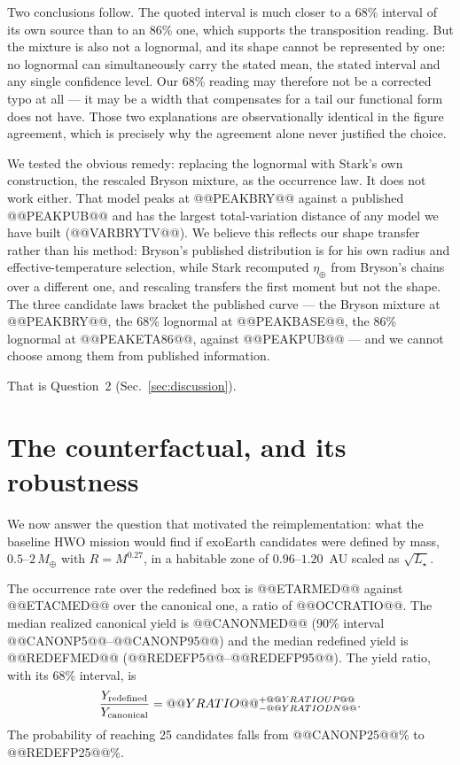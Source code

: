 \documentclass[11pt,a4paper]{article}
\begin{document}
Two conclusions follow. The quoted interval is much closer to a 68\% interval of its own source
than to an 86\% one, which supports the transposition reading. But the mixture is also not a
lognormal, and its shape cannot be represented by one: no lognormal can simultaneously carry the
stated mean, the stated interval and any single confidence level. Our 68\% reading may therefore
not be a corrected typo at all --- it may be a width that compensates for a tail our functional
form does not have. Those two explanations are observationally identical in the figure agreement,
which is precisely why the agreement alone never justified the choice.

We tested the obvious remedy: replacing the lognormal with Stark's own construction, the rescaled
Bryson mixture, as the occurrence law. It does not work either. That model peaks at @@PEAKBRY@@
against a published @@PEAKPUB@@ and has the largest total-variation distance of any model we have
built (@@VARBRYTV@@). We believe this reflects our shape transfer rather than his method:
Bryson's published distribution is for his own radius and effective-temperature selection, while
Stark recomputed $\eta_\oplus$ from Bryson's chains over a different one, and rescaling transfers
the first moment but not the shape. The three candidate laws bracket the published curve --- the
Bryson mixture at @@PEAKBRY@@, the 68\% lognormal at @@PEAKBASE@@, the 86\% lognormal at
@@PEAKETA86@@, against @@PEAKPUB@@ --- and we cannot choose among them from published information.

That is Question~2 (Sec.~\ref{sec:discussion}).

\section{The counterfactual, and its robustness}
\label{sec:result}

We now answer the question that motivated the reimplementation: what the baseline HWO mission
would find if exoEarth candidates were defined by mass, $0.5$--$2\,M_\oplus$ with $R = M^{0.27}$,
in a habitable zone of $0.96$--$1.20$~AU scaled as $\sqrt{L_\star}$.

The occurrence rate over the redefined box is @@ETARMED@@ against @@ETACMED@@ over the canonical
one, a ratio of @@OCCRATIO@@. The median realized canonical yield is @@CANONMED@@ (90\% interval
@@CANONP5@@--@@CANONP95@@) and the median redefined yield is @@REDEFMED@@
(@@REDEFP5@@--@@REDEFP95@@). The yield ratio, with its 68\% interval, is
\[
  \frac{Y_{\rm redefined}}{Y_{\rm canonical}} = @@YRATIO@@^{+@@YRATIOUP@@}_{-@@YRATIODN@@}.
\]
The probability of reaching 25 candidates falls from @@CANONP25@@\% to @@REDEFP25@@\%.
\end{document}
